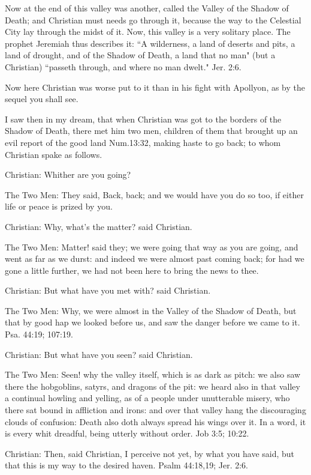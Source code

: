 Now at the end of this valley was another, called the Valley of the Shadow of Death; and Christian must needs go through it, because the way to the Celestial City lay through the midst of it. Now, this valley is a very solitary place. The prophet Jeremiah thus describes it: ``A wilderness, a land of deserts and pits, a land of drought, and of the Shadow of Death, a land that no man" (but a Christian) ``passeth through, and where no man dwelt." Jer. 2:6.

Now here Christian was worse put to it than in his fight with Apollyon, as by the sequel you shall see.

I saw then in my dream, that when Christian was got to the borders of the Shadow of Death, there met him two men, children of them that brought up an evil report of the good land Num.13:32, making haste to go back; to whom Christian spake as follows.

Christian: Whither are you going?

The Two Men: They said, Back, back; and we would have you do so too, if either life or peace is prized by you.

Christian: Why, what's the matter? said Christian.

The Two Men: Matter! said they; we were going that way as you are going, and went as far as we durst: and indeed we were almost past coming back; for had we gone a little further, we had not been here to bring the news to thee.

Christian: But what have you met with? said Christian.

The Two Men: Why, we were almost in the Valley of the Shadow of Death, but that by good hap we looked before us, and saw the danger before we came to it. Psa. 44:19; 107:19.

Christian: But what have you seen? said Christian.

The Two Men: Seen! why the valley itself, which is as dark as pitch: we also saw there the hobgoblins, satyrs, and dragons of the pit: we heard also in that valley a continual howling and yelling, as of a people under unutterable misery, who there sat bound in affliction and irons: and over that valley hang the discouraging clouds of confusion: Death also doth always spread his wings over it. In a word, it is every whit dreadful, being utterly without order. Job 3:5; 10:22.

Christian: Then, said Christian, I perceive not yet, by what you have said, but that this is my way to the desired haven. Psalm 44:18,19; Jer. 2:6.

